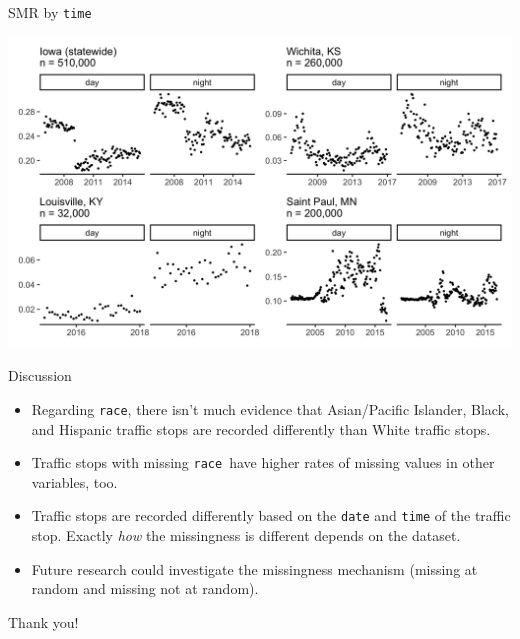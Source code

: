 \documentclass[11pt]{beamer}
\newcommand{\race}{\texttt{race}}
\begin{document}
\begin{frame}{SMR by \texttt{time}}
	\begin{center}
	\includegraphics[scale=0.15]{fig/smr_daynnite.png}
	\end{center}
\end{frame}

\begin{frame}{Discussion}
	\begin{itemize}
	\item Regarding \race, there isn't much evidence that Asian/Pacific Islander, Black, and Hispanic traffic stops are recorded differently than White traffic stops. 
	\item Traffic stops with missing \race \, have higher rates of missing values in other variables, too.
	\item Traffic stops are recorded differently based on the \texttt{date} and \texttt{time} of the traffic stop. Exactly \emph{how} the missingness is different depends on the dataset. 
	\item Future research could investigate the missingness mechanism (missing at random and missing not at random). 
	\end{itemize}
\end{frame}

\begin{frame}
	Thank you!
\end{frame}
\end{document}
